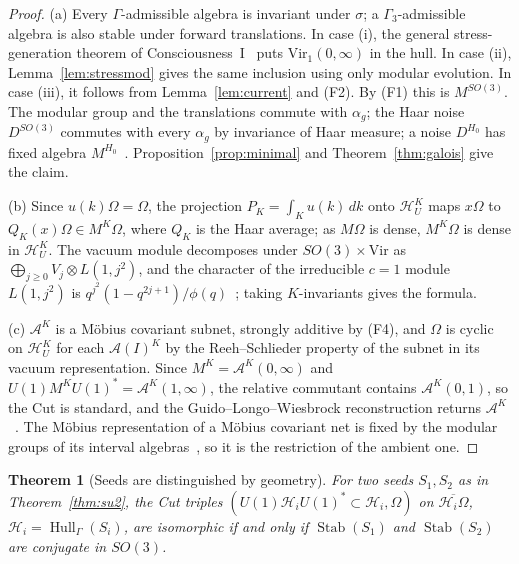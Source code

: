 \documentclass[12pt]{article}
\newtheorem{theorem}{Theorem}[section]
\theoremstyle{definition}
\theoremstyle{remark}
\newcommand{\Hull}{\operatorname{Hull}}
\newcommand{\Stab}{\operatorname{Stab}}
\newcommand{\Vir}{\mathrm{Vir}}
\begin{document}
\begin{proof}
(a) Every \(\Gamma\)-admissible algebra is invariant under \(\sigma\);
a \(\Gamma_3\)-admissible algebra is also stable under forward translations.
In case (i), the general stress-generation theorem of
Consciousness~I~\cite{PaperI} puts \(\Vir_1(0,\infty)\) in the hull.
In case (ii), Lemma~\ref{lem:stressmod} gives the same inclusion using
only modular evolution. In case (iii), it follows from
Lemma~\ref{lem:current} and (F2). By (F1) this is \(M^{SO(3)}\).
The modular group and the translations commute with \(\alpha_g\); the Haar noise
\(D^{SO(3)}\) commutes with every \(\alpha_g\) by invariance of Haar measure; a noise
\(D^{H_0}\) has fixed algebra \(M^{H_0}\)~\cite{PaperI}. Proposition~\ref{prop:minimal}
and Theorem~\ref{thm:galois} give the claim.

(b) Since \(u(k)\Omega=\Omega\), the projection \(P_K=\int_Ku(k)\,dk\) onto
\(\mathcal H_U^K\) maps \(x\Omega\) to \(Q_K(x)\Omega\in M^K\Omega\), where \(Q_K\) is the
Haar average; as \(M\Omega\) is dense, \(M^K\Omega\) is dense in \(\mathcal H_U^K\). The
vacuum module decomposes under \(SO(3)\times\Vir\) as
\(\bigoplus_{j\ge0}V_j\otimes L(1,j^2)\), and the character of the irreducible
\(c=1\) module \(L(1,j^2)\) is \(q^{j^2}(1-q^{2j+1})/\phi(q)\)~\cite{Rehren,Segal,KR};
taking \(K\)-invariants gives the formula.

(c) \(\mathcal A^K\) is a M\"obius covariant subnet, strongly additive by (F4), and
\(\Omega\) is cyclic on \(\mathcal H_U^K\) for each \(\mathcal A(I)^K\) by the
Reeh--Schlieder property of the subnet in its vacuum representation. Since
\(M^K=\mathcal A^K(0,\infty)\) and \(U(1)M^KU(1)^*=\mathcal A^K(1,\infty)\), the relative
commutant contains \(\mathcal A^K(0,1)\), so the Cut is standard, and the
Guido--Longo--Wiesbrock reconstruction returns \(\mathcal A^K\)~\cite{GLW}. The M\"obius
representation of a M\"obius covariant net is fixed by the modular groups of its
interval algebras~\cite{BGL}, so it is the restriction of the ambient one.
\end{proof}

\begin{theorem}[Seeds are distinguished by geometry]\label{thm:distinguish}
For two seeds \(S_1,S_2\) as in Theorem~\ref{thm:su2}, the Cut triples
\((U(1)\mathcal H_iU(1)^*\subset\mathcal H_i,\Omega)\) on
\(\overline{\mathcal H_i\Omega}\), \(\mathcal H_i=\Hull_\Gamma(S_i)\), are isomorphic if
and only if \(\Stab(S_1)\) and \(\Stab(S_2)\) are conjugate in \(SO(3)\).
\end{theorem}
\end{document}
